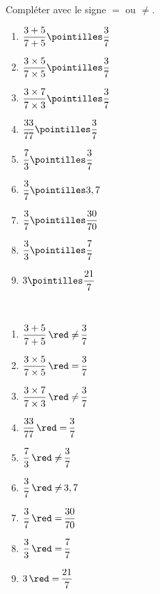 \begin{exercice*}
   Compléter avec le signe $=$ ou $\neq$. \medskip   
      \begin{multicols}{3}
         \begin{spacing}{2}
            \begin{enumerate}
               \item $\dfrac{3+5}{7+5} \pointilles \dfrac{3}{7}$
               \item $\dfrac{3\times5}{7\times5} \pointilles \dfrac{3}{7}$
               \item $\dfrac{3\times7}{7\times3} \pointilles \dfrac{3}{7}$
               \columnbreak
               \item $\dfrac{33}{77} \pointilles \dfrac{3}{7}$
               \item $\dfrac{7}{3} \pointilles \dfrac{3}{7}$
               \item $\dfrac{3}{7} \pointilles 3,7$
               \columnbreak
               \item $\dfrac{3}{7} \pointilles \dfrac{30}{70}$
               \item $\dfrac{3}{3} \pointilles \dfrac{7}{7}$
               \item $3 \pointilles \dfrac{21}{7}$
            \end{enumerate}
         \end{spacing}
      \end{multicols}   
\end{exercice*}

\begin{corrige}
   \phantom{rrr}\\
   \begin{multicols}{3}
      \begin{spacing}{2}
         \begin{enumerate}
            \item $\dfrac{3+5}{7+5} \, {\red \neq} \, \dfrac{3}{7}$
            \item $\dfrac{3\times5}{7\times5} \, {\red =} \, \dfrac{3}{7}$
            \item $\dfrac{3\times7}{7\times3} \, {\red \neq} \, \dfrac{3}{7}$
            \columnbreak
            \item $\dfrac{33}{77} \, {\red =} \,  \dfrac{3}{7}$
            \item $\dfrac{7}{3} \, {\red \neq} \, \dfrac{3}{7}$
            \item $\dfrac{3}{7} \, {\red \neq} \, 3,7$
            \columnbreak
            \item $\dfrac{3}{7} \, {\red =} \, \dfrac{30}{70}$
            \item $\dfrac{3}{3} \, {\red =} \, \dfrac{7}{7}$
            \item $3 \, {\red =} \, \dfrac{21}{7}$
         \end{enumerate}
      \end{spacing}
   \end{multicols}
\end{corrige}